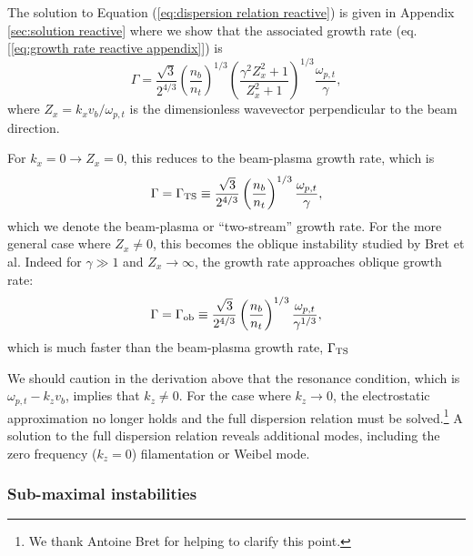 \documentclass[usenatbib,iop,apj]{emulateapj}
\begin{document}
The solution to Equation (\ref{eq:dispersion relation reactive}) is given in Appendix \ref{sec:solution reactive} where we show that the associated growth rate (eq.[\ref{eq:growth rate reactive appendix}]) is 
\begin{equation}\label{eq:growth rate reactive}
 \Gamma = \frac{\sqrt{3}}{2^{4/3}}\left(\frac{n_b}{n_t}\right)^{1/3}\left(\frac{\gamma^2 Z_x^2 + 1}{Z_x^2 + 1}\right)^{1/3}\frac{\omega_{p,t}}{\gamma},
\end{equation}
where $Z_x = k_xv_b/\omega_{p,t}$ is the dimensionless wavevector perpendicular to the beam direction.

For $k_x = 0 \rightarrow Z_x = 0$, this reduces to the beam-plasma growth rate, which is
\begin{equation}\label{eq:growth rate bp}
 \Gamma = \Gamma_{\rm TS} \equiv \frac{\sqrt{3}}{2^{4/3}}\left(\frac{n_b}{n_t}\right)^{1/3}\frac{\omega_{p,t}}{\gamma},
\end{equation}
which we denote the beam-plasma or ``two-stream'' growth rate.
For the more general case where $Z_x\ne 0$, this becomes the oblique instability studied by Bret et al.  Indeed for $\gamma \gg 1$ and $Z_x \rightarrow \infty$, the growth rate approaches oblique growth rate:
\begin{equation}
 \Gamma = \Gamma_{\rm ob} \equiv \frac{\sqrt{3}}{2^{4/3}}\left(\frac{n_b}{n_t}\right)^{1/3}\frac{\omega_{p,t}}{\gamma^{1/3}},
\end{equation}
which is much faster than the beam-plasma growth rate, $\Gamma_{\rm TS}$

We should caution in the derivation above that the resonance condition, which is $\omega_{p,t} - k_z v_b$, implies that $k_z \neq 0$.  For the case where $k_z \rightarrow 0$, the electrostatic approximation no longer holds and the full dispersion relation must be solved.\footnote{We thank Antoine Bret for helping to clarify this point.}  A solution to the full dispersion relation reveals additional modes, including the zero frequency ($k_z = 0$) filamentation or Weibel mode. 

\subsubsection{Sub-maximal instabilities}
\end{document}
